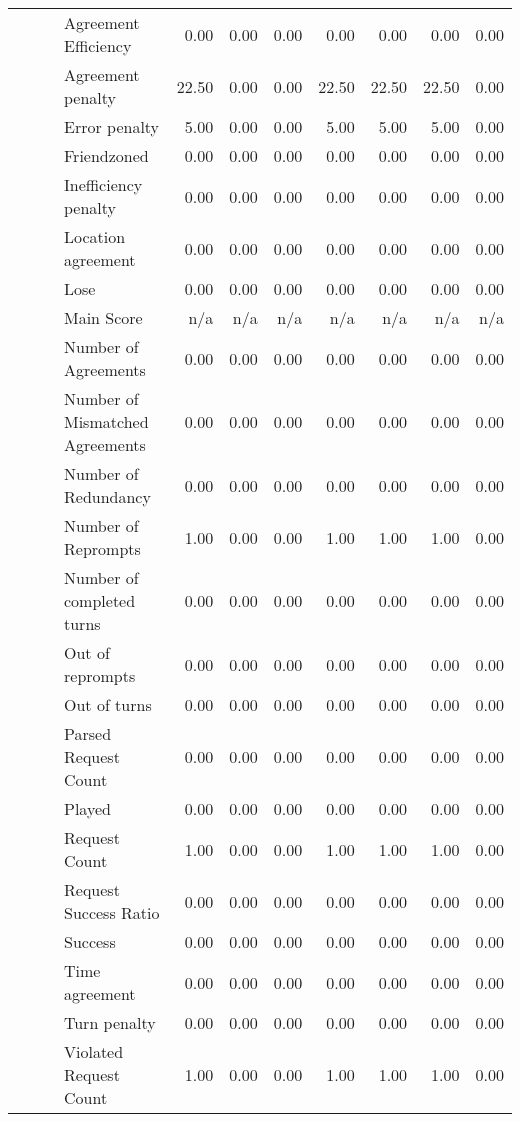 \begin{tabular}{llllrrrrrrr}
 &  &  & Agreement Efficiency & 0.00 & 0.00 & 0.00 & 0.00 & 0.00 & 0.00 & 0.00 \\
 &  &  & Agreement penalty & 22.50 & 0.00 & 0.00 & 22.50 & 22.50 & 22.50 & 0.00 \\
 &  &  & Error penalty & 5.00 & 0.00 & 0.00 & 5.00 & 5.00 & 5.00 & 0.00 \\
 &  &  & Friendzoned & 0.00 & 0.00 & 0.00 & 0.00 & 0.00 & 0.00 & 0.00 \\
 &  &  & Inefficiency penalty & 0.00 & 0.00 & 0.00 & 0.00 & 0.00 & 0.00 & 0.00 \\
 &  &  & Location agreement & 0.00 & 0.00 & 0.00 & 0.00 & 0.00 & 0.00 & 0.00 \\
 &  &  & Lose & 0.00 & 0.00 & 0.00 & 0.00 & 0.00 & 0.00 & 0.00 \\
 &  &  & Main Score & n/a & n/a & n/a & n/a & n/a & n/a & n/a \\
 &  &  & Number of Agreements & 0.00 & 0.00 & 0.00 & 0.00 & 0.00 & 0.00 & 0.00 \\
 &  &  & Number of Mismatched Agreements & 0.00 & 0.00 & 0.00 & 0.00 & 0.00 & 0.00 & 0.00 \\
 &  &  & Number of Redundancy & 0.00 & 0.00 & 0.00 & 0.00 & 0.00 & 0.00 & 0.00 \\
 &  &  & Number of Reprompts & 1.00 & 0.00 & 0.00 & 1.00 & 1.00 & 1.00 & 0.00 \\
 &  &  & Number of completed turns & 0.00 & 0.00 & 0.00 & 0.00 & 0.00 & 0.00 & 0.00 \\
 &  &  & Out of reprompts & 0.00 & 0.00 & 0.00 & 0.00 & 0.00 & 0.00 & 0.00 \\
 &  &  & Out of turns & 0.00 & 0.00 & 0.00 & 0.00 & 0.00 & 0.00 & 0.00 \\
 &  &  & Parsed Request Count & 0.00 & 0.00 & 0.00 & 0.00 & 0.00 & 0.00 & 0.00 \\
 &  &  & Played & 0.00 & 0.00 & 0.00 & 0.00 & 0.00 & 0.00 & 0.00 \\
 &  &  & Request Count & 1.00 & 0.00 & 0.00 & 1.00 & 1.00 & 1.00 & 0.00 \\
 &  &  & Request Success Ratio & 0.00 & 0.00 & 0.00 & 0.00 & 0.00 & 0.00 & 0.00 \\
 &  &  & Success & 0.00 & 0.00 & 0.00 & 0.00 & 0.00 & 0.00 & 0.00 \\
 &  &  & Time agreement & 0.00 & 0.00 & 0.00 & 0.00 & 0.00 & 0.00 & 0.00 \\
 &  &  & Turn penalty & 0.00 & 0.00 & 0.00 & 0.00 & 0.00 & 0.00 & 0.00 \\
 &  &  & Violated Request Count & 1.00 & 0.00 & 0.00 & 1.00 & 1.00 & 1.00 & 0.00 \\

\end{tabular}
